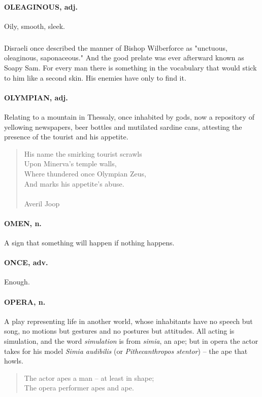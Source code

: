 \documentclass[11pt]{article}
\begin{document}
\paragraph{OLEAGINOUS, adj.}  Oily, smooth, sleek.
\subparagraph{}   Disraeli once described the manner of Bishop Wilberforce as
"unctuous, oleaginous, saponaceous."  And the good prelate was ever
afterward known as Soapy Sam.  For every man there is something in the
vocabulary that would stick to him like a second skin.  His enemies
have only to find it.

\paragraph{OLYMPIAN, adj.}  Relating to a mountain in Thessaly, once inhabited by
gods, now a repository of yellowing newspapers, beer bottles and
mutilated sardine cans, attesting the presence of the tourist and his
appetite.

\begin{quote}   His name the smirking tourist scrawls \\
  Upon Minerva's temple walls, \\
  Where thundered once Olympian Zeus, \\
  And marks his appetite's abuse. \\
 \\
Averil Joop \end{quote}


\paragraph{OMEN, n.}  A sign that something will happen if nothing happens.

\paragraph{ONCE, adv.}  Enough.

\paragraph{OPERA, n.}  A play representing life in another world, whose
inhabitants have no speech but song, no motions but gestures and no
postures but attitudes.  All acting is simulation, and the word
{\em simulation} is from {\em simia}, an ape; but in opera the actor takes for
his model {\em Simia audibilis} (or {\em Pithecanthropos stentor}) -- the ape
that howls.

\begin{quote}   The actor apes a man -- at least in shape; \\
  The opera performer apes and ape.  \end{quote}
\end{document}

